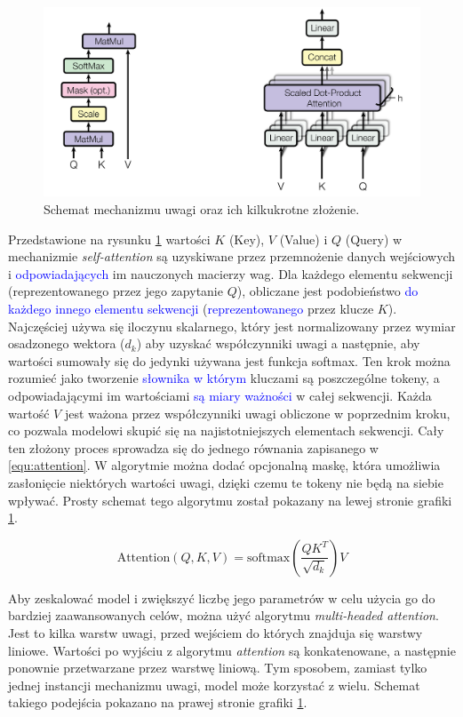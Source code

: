 \documentclass[data-science]{agh-wi} %
\begin{document}
\begin{figure}[ht!]
    \centering
    \includegraphics[width=0.8\linewidth]{./img/attention_heads.png}
    \caption{Schemat mechanizmu uwagi oraz ich kilkukrotne złożenie.}\label{fig:attention_heads}
\end{figure}

Przedstawione na rysunku \ref*{fig:attention_heads} wartości $K$ (Key), $V$ (Value) i $Q$ (Query) w mechanizmie \textit{self-attention} są uzyskiwane przez przemnożenie danych wejściowych i \textcolor{blue}{odpowiadających} im nauczonych macierzy wag. Dla każdego elementu sekwencji (reprezentowanego przez jego zapytanie $Q$), obliczane jest podobieństwo \textcolor{blue}{do każdego innego elementu sekwencji} (\textcolor{blue}{reprezentowanego} przez klucze $K$). Najczęściej używa się iloczynu skalarnego, który jest normalizowany przez wymiar osadzonego wektora ($d_k$) aby uzyskać współczynniki uwagi a następnie, aby wartości sumowały się do jedynki używana jest funkcja softmax. Ten krok można rozumieć jako tworzenie \textcolor{blue}{słownika w którym} kluczami są poszczególne tokeny, a odpowiadającymi im wartościami \textcolor{blue}{są miary ważności} w całej sekwencji. Każda wartość $V$ jest ważona przez współczynniki uwagi obliczone w poprzednim kroku, co pozwala modelowi skupić się na najistotniejszych elementach sekwencji. Cały ten złożony proces sprowadza się do jednego równania zapisanego w \ref*{equ:attention}. W algorytmie można dodać opcjonalną maskę, która umożliwia zasłonięcie niektórych wartości uwagi, dzięki czemu te tokeny nie będą na siebie wpływać. Prosty schemat tego algorytmu został pokazany na lewej stronie grafiki \ref*{fig:attention_heads}.

\begin{equation}
    \text{Attention}(Q, K, V) = \text{softmax}\left(\dfrac{QK^T}{\sqrt{d_k}}\right)V
    \label{equ:attention}
\end{equation}

Aby zeskalować model i zwiększyć liczbę jego parametrów w celu użycia go do bardziej zaawansowanych celów, można użyć algorytmu \textit{multi-headed attention}. Jest to kilka warstw uwagi, przed wejściem do których znajduja się warstwy liniowe. Wartości po wyjściu z algorytmu \textit{attention} są konkatenowane, a następnie ponownie przetwarzane przez warstwę liniową. Tym sposobem, zamiast tylko jednej instancji mechanizmu uwagi, model może korzystać z wielu. Schemat takiego podejścia pokazano na prawej stronie grafiki \ref*{fig:attention_heads}.
\end{document}
